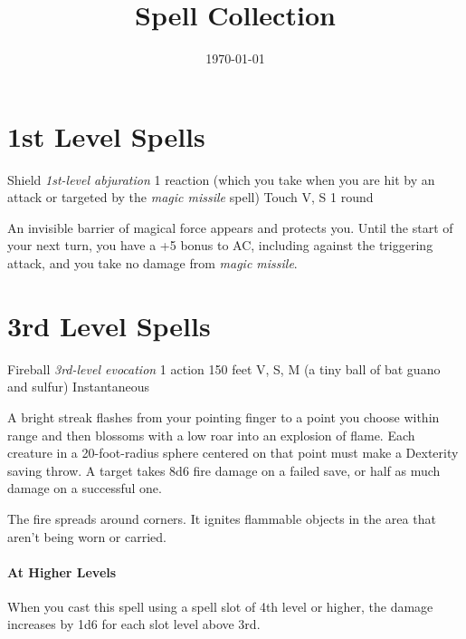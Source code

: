 \documentclass[letterpaper, 11pt, bg=full, twocolumn, stats=modern]{dndbook}
\title{Spell Collection}
\date{\today}
\begin{document}
\tableofcontents
\clearpage

\section{1st Level Spells}

\vspace{0.5em}

\DndSpellHeader%
  {Shield}
  {\textit{1st-level abjuration}
}
  {1 reaction (which you take when you are hit by an attack or targeted by the \textit{magic missile} spell)}
  {Touch}
  {  V, S
}
  {1 round}

\noindent
An invisible barrier of magical force appears and protects you. Until the start of your next turn, you have a +5 bonus to AC, including against the triggering attack, and you take no damage from \textit{magic missile}.

\vspace{1.5em}

\section{3rd Level Spells}

\vspace{0.5em}

\DndSpellHeader%
  {Fireball}
  {\textit{3rd-level evocation}
}
  {1 action}
  {150 feet}
  {  V, S, M (a tiny ball of bat guano and sulfur)
}
  {Instantaneous}

\noindent
A bright streak flashes from your pointing finger to a point you choose within range and then blossoms with a low roar into an explosion of flame. Each creature in a 20-foot-radius sphere centered on that point must make a Dexterity saving throw. A target takes 8d6 fire damage on a failed save, or half as much damage on a successful one.

The fire spreads around corners. It ignites flammable objects in the area that aren't being worn or carried.

  \paragraph{At Higher Levels}

When you cast this spell using a spell slot of 4th level or higher, the damage increases by 1d6 for each slot level above 3rd.

\vspace{1.5em}
\end{document}
